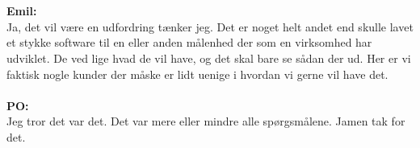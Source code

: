 \\\\
\textbf{Emil:}\\
Ja, det vil være en udfordring tænker jeg.
Det er noget helt andet end skulle lavet et stykke software til en eller anden målenhed der som en virksomhed har udviklet.
De ved lige hvad de vil have, og det skal bare se sådan der ud.
Her er vi faktisk nogle kunder der måske er lidt uenige i hvordan vi gerne vil have det. 
\\\\
\textbf{PO:}\\
Jeg tror det var det. Det var mere eller mindre alle spørgsmålene. Jamen tak for det.








